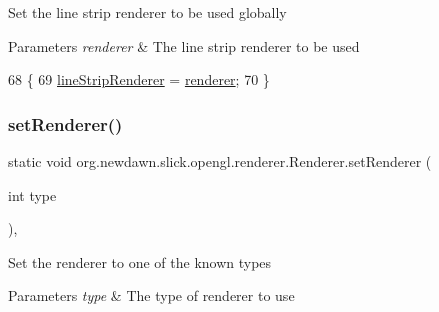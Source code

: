 Set the line strip renderer to be used globally


\begin{DoxyParams}{Parameters}
{\em renderer} & The line strip renderer to be used \\
\hline
\end{DoxyParams}

\begin{DoxyCode}
68                                                                         \{
69         \mbox{\hyperlink{classorg_1_1newdawn_1_1slick_1_1opengl_1_1renderer_1_1_renderer_ad67da40e0608a905d1d28ae6f029e293}{lineStripRenderer}} = \mbox{\hyperlink{classorg_1_1newdawn_1_1slick_1_1opengl_1_1renderer_1_1_renderer_abe140c4ec95e1ff80b86eb12a3508713}{renderer}};
70     \}
\end{DoxyCode}
\mbox{\label{classorg_1_1newdawn_1_1slick_1_1opengl_1_1renderer_1_1_renderer_a981940daeedcefe0a84ded27f17b0fc7}} 
\subsubsection{\texorpdfstring{set\+Renderer()}{setRenderer()}\hspace{0.1cm}{\footnotesize\ttfamily [1/2]}}
{\footnotesize\ttfamily static void org.\+newdawn.\+slick.\+opengl.\+renderer.\+Renderer.\+set\+Renderer (\begin{DoxyParamCaption}\item[{int}]{type }\end{DoxyParamCaption})\hspace{0.3cm}{\ttfamily [inline]}, {\ttfamily [static]}}

Set the renderer to one of the known types


\begin{DoxyParams}{Parameters}
{\em type} & The type of renderer to use \\
\hline
\end{DoxyParams}

